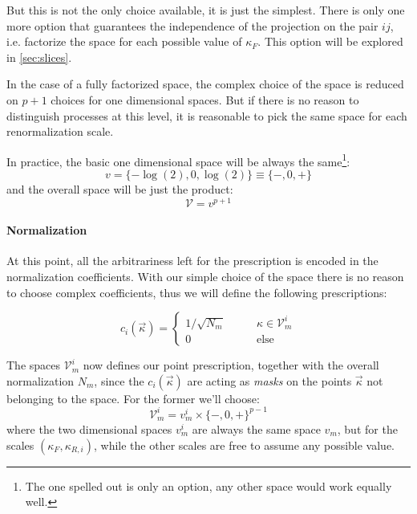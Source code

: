 But this is not the only choice available, it is just the simplest.
There is only one more option that guarantees the independence of the
projection on the pair $ij$, i.e. factorize the space for each possible value
of $\kappa_F$.
This option will be explored in \cref{sec:slices}.
\newline

In the case of a fully factorized space, the complex choice of the space is
reduced on $p + 1$ choices for one dimensional spaces.
But if there is no reason to distinguish processes at this level, it is
reasonable to pick the same space for each renormalization scale.

In practice, the basic one dimensional space will be always the same\footnote{
    The one spelled out is only an option, any other space would work equally
    well.
}:
\begin{equation}
    \label{eq:1dim-space}
    v = \{-\log(2), 0, \log(2)\} \equiv \{-, 0, +\}
\end{equation}
and the overall space will be just the product:
\begin{equation}
    \mathcal{V} = v^{p + 1}
\end{equation}

\paragraph{Normalization} At this point, all the arbitrariness left for the
prescription is encoded in the normalization coefficients.
With our simple choice of the space there is no reason to choose complex
coefficients, thus we will define the following prescriptions:

\begin{equation}
\label{eq:norm_coeff}
    c_i(\vec{\kappa}) = 
    \begin{cases}
        1 / \sqrt{N_m}     \qquad &\kappa \in \mathcal{V}^i_m\\
        0                  \qquad &\text{else}
    \end{cases}
\end{equation}

The spaces $\mathcal{V}_m^i$ now defines our point prescription, together with
the overall normalization $N_m$, since the $c_{i}(\vec{\kappa})$ are acting as \textit{masks} on the points $\vec{\kappa}$ not belonging to the space.
For the former we'll choose:
\begin{equation}
    \mathcal{V}_m^i = v_m^i \times \{-, 0, +\}^{p-1}
\end{equation}
where the two dimensional spaces $v_m^i$ are always the same space $v_m$, but
for the scales $(\kappa_F, \kappa_{R,i})$, while the other scales are free to
assume any possible value.

